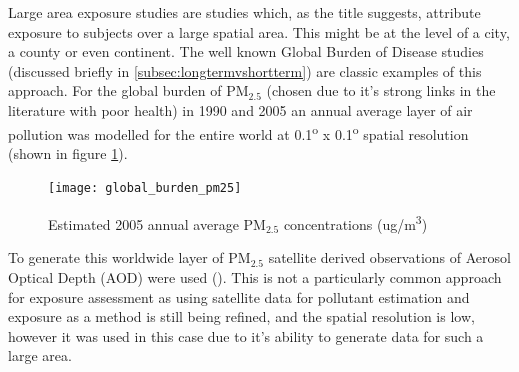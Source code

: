 Large area exposure studies are studies which, as the title suggests, attribute exposure to subjects over a large spatial area. This might be at the level of a city, a county or even continent. The well known Global Burden of Disease studies (discussed briefly in \ref{subsec:longtermvshortterm}) are classic examples of this approach. For the global burden of PM$_{2.5}$ (chosen due to it's strong links in the literature with poor health) in 1990 and 2005 an annual average layer of air pollution was modelled for the entire world at 0.1\textsuperscript{o} x 0.1\textsuperscript{o} spatial resolution (shown in figure \ref{fig:globalburdenpm25}).\hfill

\begin{figure}[H]
\centering
\texttt{[image: global\_burden\_pm25]}
\caption{Estimated 2005 annual average PM$_{2.5}$ concentrations (ug/m\textsuperscript{3})}
\label{fig:globalburdenpm25}
\end{figure}

To generate this worldwide layer of PM$_{2.5}$ satellite derived observations of Aerosol Optical Depth (AOD) were used (\cite{Brauer2012}). This is not a particularly common approach for exposure assessment as using satellite data for pollutant estimation and exposure as a method is still being refined, and the spatial resolution is low, however it was used in this case due to it's ability to generate data for such a large area.

